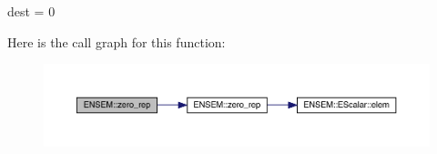 dest = 0 

Here is the call graph for this function\+:\nopagebreak
\begin{figure}[H]
\begin{center}
\leavevmode
\includegraphics[width=350pt]{d8/d55/group__obsmatrix_gaf3d502e6c7fccd147d8023eda09b31b4_cgraph}
\end{center}
\end{figure}
